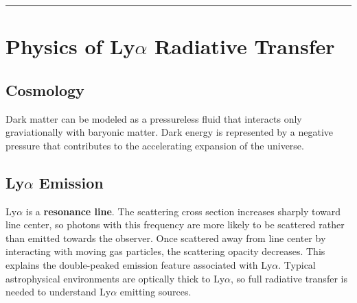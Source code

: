 \documentclass[onecolumn]{aastex63}
\begin{document}



\vspace{1cm}
\hrule
\vspace{1cm}

\section{Physics of Ly$\alpha$ Radiative Transfer}
\begin{centering}

\cite{dijkstra2017}

\end{centering}



\subsection{Cosmology}

Dark matter can be modeled as a pressureless fluid that interacts only graviationally with baryonic matter. Dark energy is represented by a negative pressure that contributes to the accelerating expansion of the universe.

\subsection{Ly$\alpha$ Emission}
Ly$\alpha$ is a \textbf{resonance line}. The scattering cross section increases sharply toward line center, so photons with this frequency are more likely to be scattered rather than emitted towards the observer. Once scattered away from line center by interacting with moving gas particles, the scattering opacity decreases. This explains the double-peaked emission feature associated with Ly$\alpha$. Typical astrophysical environments are optically thick to Ly$\alpha$, so full radiative transfer is needed to understand Ly$\alpha$ emitting sources.
\end{document}
